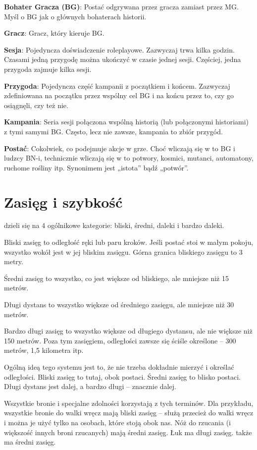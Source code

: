 {\bfseries Bohater Gracza (BG)}: Postać odgrywana przez gracza zamiast przez MG. Myśl o BG jak o głównych bohaterach historii.

{\bfseries Gracz}: Gracz, który kieruje BG.

{\bfseries Sesja}: Pojedyncza doświadczenie roleplayowe. Zazwyczaj trwa kilka godzin. Czasami jedną przygodę można ukończyć w czasie jednej sesji. Częściej, jedna przygoda zajmuje kilka sesji.

{\bfseries Przygoda}: Pojedyncza część kampanii z początkiem i końcem. Zazwyczaj zdefiniowana na początku przez wspólny cel BG i na końcu przez to, czy go osiągnęli, czy też nie. 

{\bfseries Kampania}: Seria sesji połączona wspólną historią (lub połączonymi historiami) z tymi samymi BG. Często, lecz nie zawsze, kampania to zbiór przygód.

{\bfseries Postać}: Cokolwiek, co podejmuje akcje w grze. Choć wliczają się w to BG i ludzcy BN-i, technicznie wliczają się w to potwory, kosmici, mutanci, automatony, ruchome rośliny itp. Synonimem jest „istota” bądź „potwór”.

\section {Zasięg i szybkość}

 dzieli się na 4 ogólnikowe kategorie: bliski, średni, daleki i bardzo daleki.

Bliski zasięg to odległość ręki lub paru kroków. Jeśli postać stoi w małym pokoju, wszystko wokół jest w jej bliskim zasięgu. Górna granica bliskiego zasięgu to 3 metry.

Średni zasięg to wszystko, co jest większe od bliskiego, ale mniejsze niż 15 metrów.

Długi dystans to wszystko większe od średniego zasięgu, ale mniejsze niż 30 metrów.

Bardzo długi zasięg to wszystko większe od długiego dystansu, ale nie większe niż 150 metrów. Poza tym zasięgiem, odległości zawsze się ściśle określone – 300 metrów, 1,5 kilometra itp.

Ogólną ideą tego systemu jest to, że nie trzeba dokładnie mierzyć i określać odległości. Bliski zasięg to tutaj, obok postaci. Średni zasięg to blisko postaci. Długi dystans jest dalej, a bardzo długi – znacznie dalej.

Wszystkie bronie i specjalne zdolności korzystają z tych terminów. Dla przykładu, wszystkie bronie do walki wręcz mają bliski zasięg – służą przecież do walki wręcz i można je użyć tylko na osobach, które stoją obok nas. Nóż do rzucania (i większość innych broni rzucanych) mają średni zasięg. Łuk ma długi zasięg.  także ma średni zasięg.

